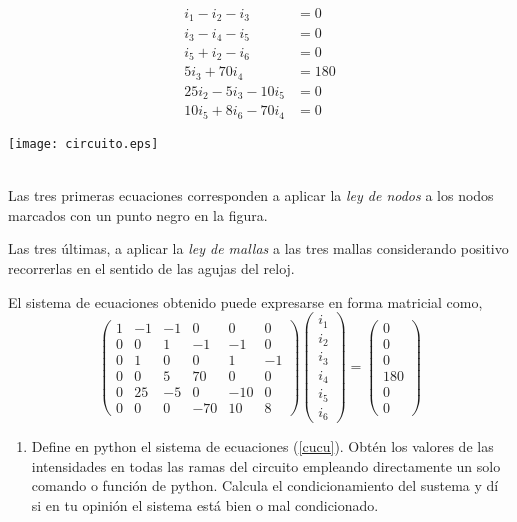\begin{enumerate}
\begin{minipage}{0.3\textwidth}
\begin{align*}
i_1 - i_2 - i_3 &= 0\\
i_3 - i_4 - i_5 &= 0\\
i_5  + i_2 -i_6&= 0\\
5i_3 + 70 i_4 &= 180\\
25i_2 -5i_3-10i_5 &= 0\\
10i_5+8i_6 -70i_4 &= 0  
\end{align*}
\end{minipage}
\begin{minipage}{0.7\textwidth}
\texttt{[image: circuito.eps]}
\end{minipage}
\ \\
Las tres primeras ecuaciones corresponden a aplicar la \emph{ley de nodos} a los nodos marcados con un punto negro en la figura. 

Las tres últimas, a aplicar la \emph{ley de mallas} a las tres mallas considerando positivo recorrerlas en el sentido de las agujas del reloj.

El sistema de ecuaciones obtenido puede expresarse en forma matricial como,
\begin{equation}\label{cucu}
\begin{pmatrix}
1& -1& -1& 0 & 0 &0\\
0& 0& 1& -1& -1& 0\\
0& 1& 0&  0&  1& -1\\ 
0& 0& 5& 70& 0& 0\\
0& 25& -5& 0& -10& 0\\
0& 0& 0& -70& 10& 8
\end{pmatrix}\begin{pmatrix}
i_1\\ i_2\\ i_3\\ i_4\\ i_5\\ i_6
\end{pmatrix}= \begin{pmatrix}
0\\ 0\\ 0\\ 180\\ 0\\ 0
\end{pmatrix} 
\end{equation}



\begin{enumerate}
\item Define en python el sistema de ecuaciones (\ref{cucu}). Obtén los valores de las intensidades en todas las ramas del circuito empleando directamente un solo comando o función de python. Calcula el condicionamiento del sustema y dí si en tu opinión el sistema está bien o mal condicionado.


\end{enumerate}
\end{enumerate}
